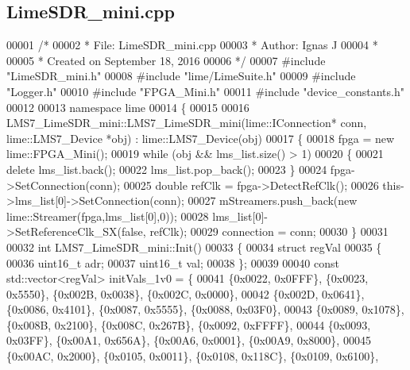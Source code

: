 \subsection{Lime\+S\+D\+R\+\_\+mini.\+cpp}
\label{LimeSDR__mini_8cpp_source}

\begin{DoxyCode}
00001 \textcolor{comment}{/*}
00002 \textcolor{comment}{ * File:   LimeSDR\_mini.cpp}
00003 \textcolor{comment}{ * Author: Ignas J}
00004 \textcolor{comment}{ *}
00005 \textcolor{comment}{ * Created on September 18, 2016}
00006 \textcolor{comment}{ */}
00007 \textcolor{preprocessor}{#include "LimeSDR_mini.h"}
00008 \textcolor{preprocessor}{#include "lime/LimeSuite.h"}
00009 \textcolor{preprocessor}{#include "Logger.h"}
00010 \textcolor{preprocessor}{#include "FPGA_Mini.h"}
00011 \textcolor{preprocessor}{#include "device_constants.h"}
00012 
00013 \textcolor{keyword}{namespace }lime
00014 \{
00015 
00016 LMS7_LimeSDR_mini::LMS7_LimeSDR_mini(lime::IConnection* conn, lime::LMS7_Device *obj) : 
      lime::LMS7_Device(obj)
00017 \{
00018     fpga = \textcolor{keyword}{new} lime::FPGA_Mini();
00019     \textcolor{keywordflow}{while} (obj && lms_list.size() > 1)
00020     \{
00021         \textcolor{keyword}{delete} lms_list.back();
00022         lms_list.pop\_back();
00023     \}
00024     fpga->SetConnection(conn);
00025     \textcolor{keywordtype}{double} refClk = fpga->DetectRefClk();
00026     this->lms_list[0]->SetConnection(conn);
00027     mStreamers.push\_back(\textcolor{keyword}{new} lime::Streamer(fpga,lms_list[0],0));
00028     lms_list[0]->SetReferenceClk\_SX(\textcolor{keyword}{false}, refClk);
00029     connection = conn;
00030 \}
00031 
00032 \textcolor{keywordtype}{int} LMS7_LimeSDR_mini::Init()
00033 \{
00034     \textcolor{keyword}{struct }regVal
00035     \{
00036         uint16\_t adr;
00037         uint16\_t val;
00038     \};
00039 
00040     \textcolor{keyword}{const} std::vector<regVal> initVals\_1v0 = \{
00041         \{0x0022, 0x0FFF\}, \{0x0023, 0x5550\}, \{0x002B, 0x0038\}, \{0x002C, 0x0000\},
00042         \{0x002D, 0x0641\}, \{0x0086, 0x4101\}, \{0x0087, 0x5555\}, \{0x0088, 0x03F0\},
00043         \{0x0089, 0x1078\}, \{0x008B, 0x2100\}, \{0x008C, 0x267B\}, \{0x0092, 0xFFFF\},
00044     \{0x0093, 0x03FF\}, \{0x00A1, 0x656A\}, \{0x00A6, 0x0001\}, \{0x00A9, 0x8000\},
00045         \{0x00AC, 0x2000\}, \{0x0105, 0x0011\}, \{0x0108, 0x118C\}, \{0x0109, 0x6100\},

\end{DoxyCode}
